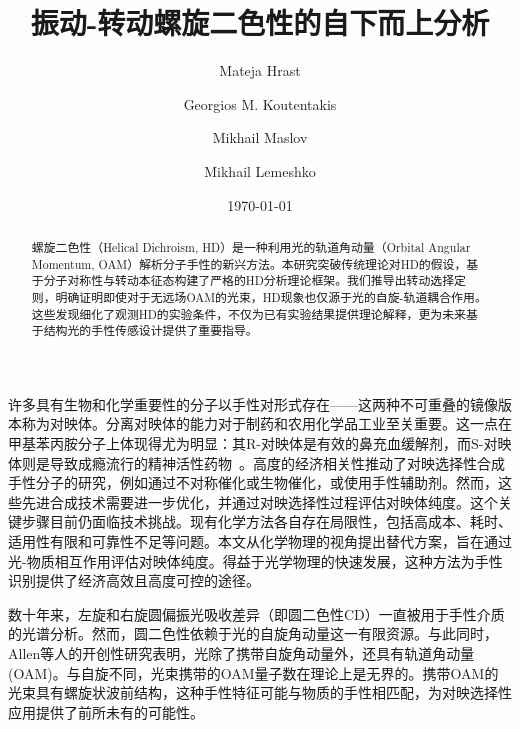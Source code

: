 \documentclass[reprint,aps,prl,twocolumn,superscriptaddress,groupedaddress]{revtex4-2}
\begin{document}
\title{振动-转动螺旋二色性的自下而上分析}
\author{Mateja Hrast}
\author{Georgios M. Koutentakis}
\author{Mikhail Maslov}
\author{Mikhail Lemeshko}
\date{\today}
\begin{abstract}
螺旋二色性（Helical Dichroism, HD）是一种利用光的轨道角动量（Orbital Angular Momentum, OAM）解析分子手性的新兴方法。本研究突破传统理论对HD的假设，基于分子对称性与转动本征态构建了严格的HD分析理论框架。我们推导出转动选择定则，明确证明即使对于无远场OAM的光束，HD现象也仅源于光的自旋-轨道耦合作用。这些发现细化了观测HD的实验条件，不仅为已有实验结果提供理论解释，更为未来基于结构光的手性传感设计提供了重要指导。
\end{abstract}
\maketitle
许多具有生物和化学重要性的分子以手性对形式存在——这两种不可重叠的镜像版本称为对映体。分离对映体的能力对于制药和农用化学品工业至关重要\cite{MAIER2001}。这一点在甲基苯丙胺分子上体现得尤为明显：其R-对映体是有效的鼻充血缓解剂，而S-对映体则是导致成瘾流行的精神活性药物~\cite{barkholtz2023}。高度的经济相关性推动了对映选择性合成手性分子的研究，例如通过不对称催化或生物催化，或使用手性辅助剂\cite{Brown1989}。然而，这些先进合成技术需要进一步优化，并通过对映选择性过程评估对映体纯度。这个关键步骤目前仍面临技术挑战。现有化学方法各自存在局限性，包括高成本、耗时、适用性有限和可靠性不足等问题\cite{qian2023}。本文从化学物理的视角提出替代方案，旨在通过光-物质相互作用评估对映体纯度。得益于光学物理的快速发展\cite{Koch2019}，这种方法为手性识别提供了经济高效且高度可控的途径。

数十年来，左旋和右旋圆偏振光吸收差异（即圆二色性CD）\cite{deutsche1970,Holzwarth1974}一直被用于手性介质的光谱分析\cite{Miles2021}。然而，圆二色性依赖于光的自旋角动量这一有限资源。与此同时，Allen等人\cite{Allen1992}的开创性研究表明，光除了携带自旋角动量外，还具有轨道角动量(OAM)。与自旋不同，光束携带的OAM量子数在理论上是无界的。携带OAM的光束具有螺旋状波前结构，这种手性特征可能与物质的手性相匹配，为对映选择性应用提供了前所未有的可能性。
\end{document}
